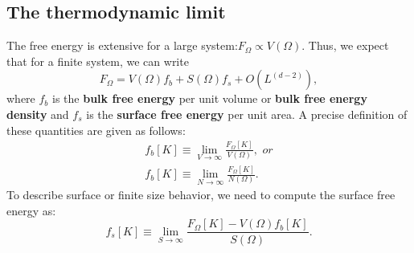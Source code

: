 \documentclass[12pt,titlepage]{article}
\numberwithin{equation}{section}
\begin{document}
\subsection{The thermodynamic limit}
The free energy is extensive for a large system:$F_{\Omega}\propto V(\Omega)$. Thus, we expect that for a finite system, we can write
\begin{equation}
    F_{\Omega} = V(\Omega)f_b + S(\Omega)f_s+O(L^(d-2)),
\end{equation}
where $f_b$ is the \textbf{bulk free energy} per unit volume or \textbf{bulk free energy density} and $f_s$ is the \textbf{surface free energy} per unit area. A precise definition of these quantities are given as follows:
\begin{equation}
\begin{split}
    f_b[K]\equiv\lim_{V\rightarrow\infty}\frac{F_{\Omega}[K]}{V(\Omega)},\textit{ or}\\
    f_b[K]\equiv\lim_{N\rightarrow\infty}\frac{F_{\Omega}[K]}{N(\Omega)}.
\end{split}
\end{equation}
To describe surface or finite size behavior, we need to compute the surface free energy as:
\begin{equation}
    f_s[K]\equiv \lim_{S\rightarrow\infty}{\frac{F_{\Omega}[K]-V(\Omega)f_b[K]}{S(\Omega)}}.
\end{equation}
\end{document}
